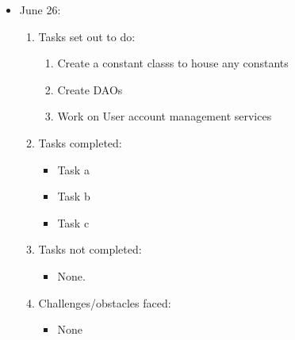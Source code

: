 \documentclass[12pt]{article}
\begin{document}
	\begin{itemize}
		\item June 26:
		\begin{enumerate}
			\item Tasks set out to do:
			\begin{enumerate}
				\item Create a constant classs to house any constants
				\item Create DAOs
				\item Work on User account management services				
			\end{enumerate}
			\item Tasks completed:
			\begin{itemize}
				\item Task a
				\item Task b
				\item Task c
			\end{itemize}
			\item Tasks not completed:
			\begin{itemize}
				\item None.
			\end{itemize}
			\item Challenges/obstacles faced:
			\begin{itemize}
				\item None
			\end{itemize}			
		\end{enumerate}
	\end{itemize}
	
\end{document}
